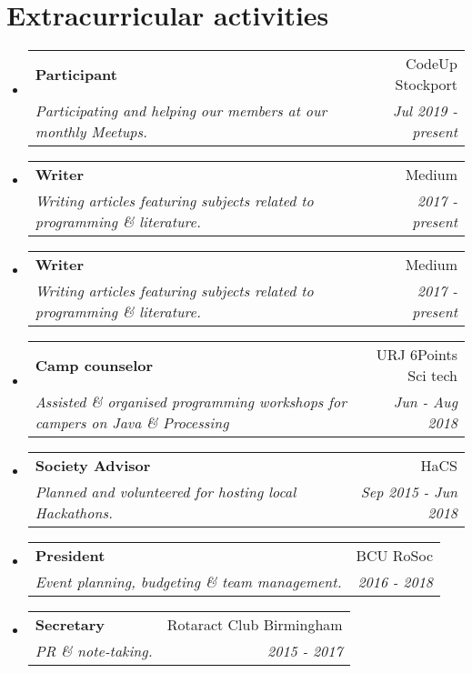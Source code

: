 \documentclass[12pt]{article}
\makeatletter
\newcommand{\resumeSubheading}[4]{
  \vspace{-1pt}\item
    \begin{tabular*}{0.97\textwidth}[t]{l@{\extracolsep{\fill}}r}
      \textbf{#1} & #2 \\
      \textit{\small#3} & \textit{\small #4} \\
    \end{tabular*}\vspace{-5pt}
}
\newcommand{\resumeSubHeadingListStart}{\begin{itemize}[leftmargin=*]}
\newcommand{\resumeSubHeadingListEnd}{\end{itemize}}
\makeatother
\begin{document}
 \section{Extracurricular activities}
    \resumeSubHeadingListStart
         \resumeSubheading
        {Participant} {CodeUp Stockport}
        {Participating and helping our members at our monthly Meetups.}{Jul 2019 - present}
        \resumeSubheading
        {Writer}{Medium}
        {Writing articles featuring subjects related to programming \& literature.}
        {2017 - present}
        \resumeSubheading
        {Writer}{Medium}
        {Writing articles featuring subjects related to programming \& literature.}
        {2017 - present}
          \resumeSubheading
        {Camp counselor}{URJ 6Points Sci tech}
        {Assisted \& organised programming workshops for campers on Java \& Processing}
        {Jun - Aug 2018}
         \resumeSubheading
        {Society Advisor}
        {HaCS}
        {Planned and volunteered for hosting local Hackathons.}
        {Sep 2015 - Jun 2018}
        \resumeSubheading
        {President}
        {BCU RoSoc}
        {Event planning, budgeting \& team management.}{2016 - 2018}
        \resumeSubheading
        {Secretary}
        {Rotaract Club Birmingham}
        {PR \& note-taking.}{2015 - 2017}
\resumeSubHeadingListEnd

\end{document}
